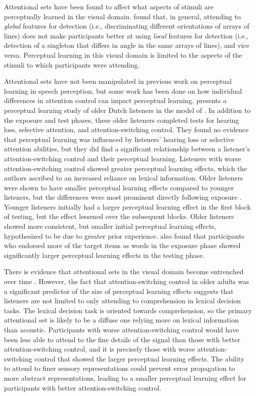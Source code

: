 Attentional sets have been found to affect what aspects of stimuli are perceptually learned in the visual domain.
\citet{Ahissar1993} found that, in general, attending to \emph{global} features for detection (i.e., discriminating different orientations of arrays of lines) does not make participants better at using \emph{local} features for detection (i.e., detection of a singleton that differs in angle in the same arrays of lines), and vice versa.  
Perceptual learning in this visual domain is limited to the aspects of the stimuli to which participants were attending.  

Attentional sets have not been manipulated in previous work on perceptual learning in speech perception, but some work has been done on how individual differences in attention control can impact perceptual learning.
\citet{Scharenborg2014} presents a perceptual learning study of older Dutch listeners in the model of \citet{Norris2003}.  
In addition to the exposure and test phases, these older listeners completed tests for hearing loss, selective attention, and attention-switching control.  
They found no evidence that perceptual learning was influenced by listeners' hearing loss or selective attention abilities, but they did find a significant relationship between a listener's attention-switching control and their perceptual learning.  
Listeners with worse attention-switching control showed greater perceptual learning effects, which the authors ascribed to an increased reliance on lexical information.  
Older listeners were shown to have smaller perceptual learning effects compared to younger listeners, but the differences were most prominent directly following exposure \citep{Scharenborg2013}.  
Younger listeners initially had a larger perceptual learning effect in the first block of testing, but the effect lessened over the subsequent blocks.  
Older listeners showed more consistent, but smaller initial perceptual learning effects, hypothesized to be due to greater prior experience.  
\citet{Scharenborg2013} also found that participants who endorsed more of the target items as words in the exposure phase showed significantly larger perceptual learning effects in the testing phase.

There is evidence that attentional sets in the visual domain become entrenched over time \citep{Leber2006}.
However, the fact that attention-switching control in older adults was a significant predictor of the size of perceptual learning effects \citep{Scharenborg2014} suggests that listeners are not limited to only attending to comprehension in lexical decision tasks.
The lexical decision task is oriented towards comprehension, so the primary attentional set is likely to be a diffuse one relying more on lexical information than acoustic.
Participants with worse attention-switching control would have been less able to attend to the fine details of the signal than those with better attention-switching control, and it is precisely those with worse attention-switching control that showed the larger perceptual learning effects.
The ability to attend to finer sensory representations could prevent error propagation to more abstract representations, leading to a smaller perceptual learning effect for participants with better attention-switching control.

